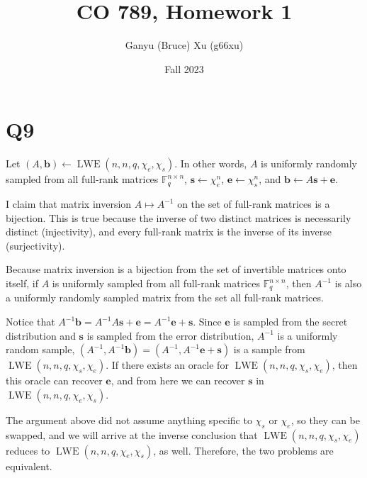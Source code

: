 \documentclass{article}
\title{CO 789, Homework 1}
\author{Ganyu (Bruce) Xu (g66xu)}
\date{Fall 2023}
\begin{document}

\section*{Q9}
Let $(A, \mathbf{b}) \leftarrow \operatorname{LWE}(n, n, q, \chi_e, \chi_s)$. In other words, $A$ is uniformly randomly sampled from all full-rank matrices $\mathbb{F}_q^{n \times n}$, $\mathbf{s} \leftarrow \chi_e^n$, $\mathbf{e} \leftarrow \chi_s^n$, and $\mathbf{b} \leftarrow A\mathbf{s} + \mathbf{e}$.

I claim that matrix inversion $A \mapsto A^{-1}$ on the set of full-rank matrices is a bijection. This is true because the inverse of two distinct matrices is necessarily distinct (injectivity), and every full-rank matrix is the inverse of its inverse (surjectivity).

Because matrix inversion is a bijection from the set of invertible matrices onto itself, if $A$ is uniformly sampled from all full-rank matrices $\mathbb{F}_q^{n \times n}$, then $A^{-1}$ is also a uniformly randomly sampled matrix from the set all full-rank matrices.

Notice that $A^{-1}\mathbf{b} = A^{-1}A\mathbf{s} + \mathbf{e} = A^{-1}\mathbf{e} + \mathbf{s}$. Since $\mathbf{e}$ is sampled from the secret distribution and $\mathbf{s}$ is sampled from the error distribution, $A^{-1}$ is a uniformly random sample, $(A^{-1}, A^{-1}\mathbf{b}) = (A^{-1}, A^{-1}\mathbf{e} + \mathbf{s})$ is a sample from $\operatorname{LWE}(n, n, q, \chi_s, \chi_e)$. If there exists an oracle for $\operatorname{LWE}(n, n, q, \chi_s, \chi_e)$, then this oracle can recover $\mathbf{e}$, and from here we can recover $\mathbf{s}$ in $\operatorname{LWE}(n, n, q, \chi_e, \chi_s)$.

The argument above did not assume anything specific to $\chi_s$ or $\chi_e$, so they can be swapped, and we will arrive at the inverse conclusion that $\operatorname{LWE}(n, n, q, \chi_s, \chi_e)$ reduces to $\operatorname{LWE}(n, n, q, \chi_e, \chi_s)$, as well. Therefore, the two problems are equivalent.
\end{document}

